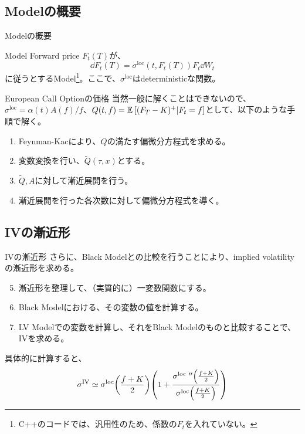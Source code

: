 \documentclass[dvipdfmx,9pt]{beamer}
\begin{document}
\subsection{Modelの概要}
\begin{frame}{Modelの概要}
  \begin{block}{Model}
    Forward price $F_{t}(T)$が、
    \begin{equation}
      \dd F_{t}(T) = \sigma^{\mathrm{loc}}(t,F_{t}(T)) F_{t} \dd W_{t}
    \end{equation}
    に従うとするModel\footnote{C++のコードでは、汎用性のため、係数の$F_{t}$を入れていない。}。ここで、$\sigma^{\mathrm{loc}}$はdeterministicな関数。
  \end{block}
  \begin{block}{European Call Optionの価格}
    当然一般に解くことはできないので、$\sigma^{\mathrm{loc}} = \alpha(t)A(f)/f$、$Q(t,f) = \exv[]{(F_{T} - K)^{+}|F_{t}=f}$として、以下のような手順で解く。
    \begin{enumerate}
      \item Feynman-Kacにより、$Q$の満たす偏微分方程式を求める。
      \item 変数変換を行い、$\tilde{Q}(\tau,x)$とする。
      \item $\tilde{Q},A$に対して漸近展開を行う。
      \item 漸近展開を行った各次数に対して偏微分方程式を導く。
    \end{enumerate}
  \end{block}
\end{frame}

\subsection{IVの漸近形}
\begin{frame}
  \begin{block}{IVの漸近形}
    さらに、Black Modelとの比較を行うことにより、implied volatilityの漸近形を求める。
    \begin{enumerate}
      \setcounter{enumi}{4}
      \item 漸近形を整理して、（実質的に）一変数関数にする。
      \item Black Modelにおける、その変数の値を計算する。
      \item LV Modelでの変数を計算し、それをBlack Modelのものと比較することで、IVを求める。
    \end{enumerate}
    具体的に計算すると、
    \begin{equation}
      \sigma^{\mathrm{IV}} \simeq \sigma^{\mathrm{loc}}\pqty{\frac{f+K}{2}}\pqty{1 + \frac{\sigma^{\mathrm{\mathrm{loc}}~\prime\prime}\pqty{\frac{f+K}{2}}}{\sigma^{\mathrm{loc}}\pqty{\frac{f+K}{2}}}}
    \end{equation}
  \end{block}
\end{frame}
\end{document}
